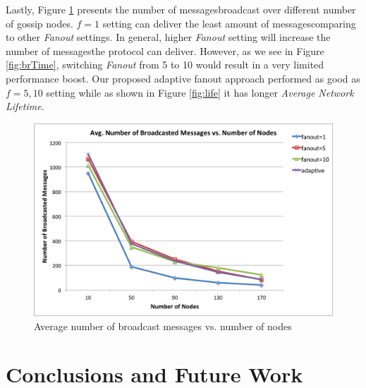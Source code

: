 \documentclass[onehalf,11pt]{beavtex}
\newcommand{\msgs}{messages}
\newcommand{\gns}{gossip nodes}
\newcommand{\anl}{Average Network Lifetime}
\begin{document}
Lastly, Figure \ref{fig:brNum} presents the number of \msgs broadcast over different number of \gns. $f=1$ setting can deliver the least amount of \msgs comparing to other \emph{Fanout} settings. In general, higher \emph{Fanout} setting will increase the number of \msgs the protocol can deliver. However, as we see in Figure \ref{fig:brTime}, switching \emph{Fanout} from 5 to 10 would result in a very limited performance boost. Our proposed adaptive fanout approach performed as good as $f=5,10$ setting while as shown in Figure \ref{fig:life} it has longer \emph{\anl}.

\begin{figure} 
	\centering
	\includegraphics[width=5.5in]{brNum.png}
	\caption{Average number of broadcast messages vs. number of nodes}
	\label{fig:brNum}
\end{figure}

\chapter{Conclusions and Future Work}
\label{Chapter6}
\end{document}
